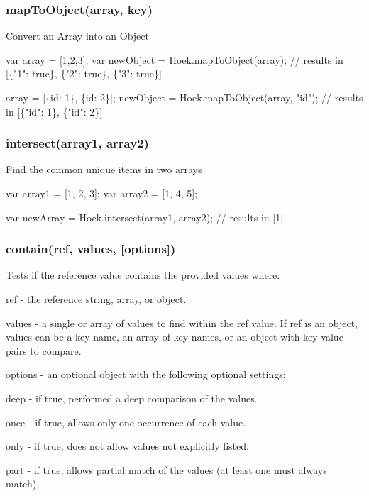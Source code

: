 \subsubsection*{map\+To\+Object(array, key)}

Convert an Array into an Object


\begin{DoxyCode}
var array = [1,2,3];
var newObject = Hoek.mapToObject(array);   // results in [\{"1": true\}, \{"2": true\}, \{"3": true\}]

array = [\{id: 1\}, \{id: 2\}];
newObject = Hoek.mapToObject(array, "id"); // results in [\{"id": 1\}, \{"id": 2\}]
\end{DoxyCode}


\subsubsection*{intersect(array1, array2)}

Find the common unique items in two arrays


\begin{DoxyCode}
var array1 = [1, 2, 3];
var array2 = [1, 4, 5];

var newArray = Hoek.intersect(array1, array2); // results in [1]
\end{DoxyCode}


\subsubsection*{contain(ref, values, \mbox{[}options\mbox{]})}

Tests if the reference value contains the provided values where\+:
\begin{DoxyItemize}
\item {\ttfamily ref} -\/ the reference string, array, or object.
\item {\ttfamily values} -\/ a single or array of values to find within the {\ttfamily ref} value. If {\ttfamily ref} is an object, {\ttfamily values} can be a key name, an array of key names, or an object with key-\/value pairs to compare.
\item {\ttfamily options} -\/ an optional object with the following optional settings\+:
\begin{DoxyItemize}
\item {\ttfamily deep} -\/ if {\ttfamily true}, performed a deep comparison of the values.
\item {\ttfamily once} -\/ if {\ttfamily true}, allows only one occurrence of each value.
\item {\ttfamily only} -\/ if {\ttfamily true}, does not allow values not explicitly listed.
\item {\ttfamily part} -\/ if {\ttfamily true}, allows partial match of the values (at least one must always match).
\end{DoxyItemize}
\end{DoxyItemize}

